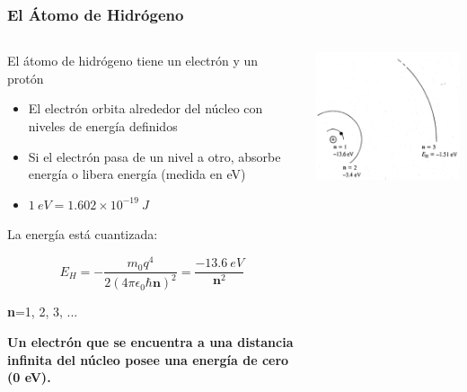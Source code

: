 \documentclass[10pt,t,aspectratio=169]{beamer}
\begin{document}
\begin{frame}[t]
  \frametitle{El Átomo de Hidrógeno}

  \begin{columns}
  
    \begin{column}{0.6\textwidth}
    
      El átomo de hidrógeno tiene un electrón y un protón
      
      \begin{itemize}
        \item El electrón orbita alrededor del núcleo con niveles de energía definidos
        \item Si el electrón pasa de un nivel a otro, absorbe energía o libera energía (medida en eV)
        \item $1\ eV = 1.602\times{}10^{-19}\ J$
      \end{itemize}

      \vspace{3mm}
      La energía está cuantizada:

      \[ E_H = -\dfrac{m_0 q^4}{2(4\pi{}\epsilon_0 \hbar \textbf{n})^2} = \dfrac{-13.6\ eV}{\textbf{n}^2} \]

      \centering
      \vspace{3mm}
      \textbf{n}=1, 2, 3, ...

      \flushleft
      \vspace{3mm}
      \textbf{Un electrón que se encuentra a una distancia infinita del núcleo posee una energía de cero (0 eV).}
    
    \end{column}
    
    \begin{column}{0.4\textwidth}
    
      \includegraphics[width=\textwidth]{./figures/atom-hydrogen.png}
      
    \end{column}
    
  \end{columns}
  
\end{frame}
\end{document}
